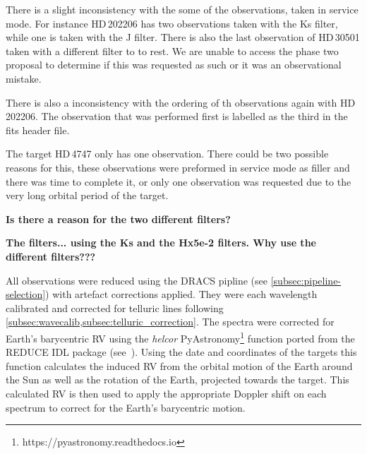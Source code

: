 There is a slight inconsistency with the some of the observations, taken in service mode.
For instance {HD\,202206} has two observations taken with the {Ks} filter, while one is taken with the {J} filter.
There is also the last observation of {HD\,30501} taken with a different filter to to rest.
We are unable to access the phase two proposal to determine if this was requested as such or it was an observational mistake. 

There is also a inconsistency with the ordering of th observations again with {HD\,202206}.
The observation that was performed first is labelled as the third in the fits header file.


The target {HD\,4747} only has one observation.
There could be two possible reasons for this, these observations were preformed in service mode as filler and there was time to complete it, or only one observation was requested due to the very long orbital period of the target.

\textbf{Is there a reason for the two different filters?}





\textbf{The filters...
using the {Ks} and the {Hx5e-2} filters.
Why use the different filters???}

All observations were reduced using the DRACS pipline (see \cref{subsec:pipeline-selection}) with artefact corrections applied.
They were each wavelength calibrated and corrected for telluric lines following  \cref{subsec:wavecalib,subsec:telluric_correction}.
The spectra were corrected for Earth's barycentric {RV} using the \emph{helcor} PyAstronomy\footnote{https://pyastronomy.readthedocs.io} function ported from the REDUCE IDL package (see~\citet[][]{piskunov_new_2002}).
Using the date and coordinates of the targets this function calculates the induced RV from the orbital motion of the Earth around the Sun as well as the rotation of the Earth, projected towards the target.
This calculated RV is then used to apply the appropriate Doppler shift on each spectrum to correct for the Earth's barycentric motion.


